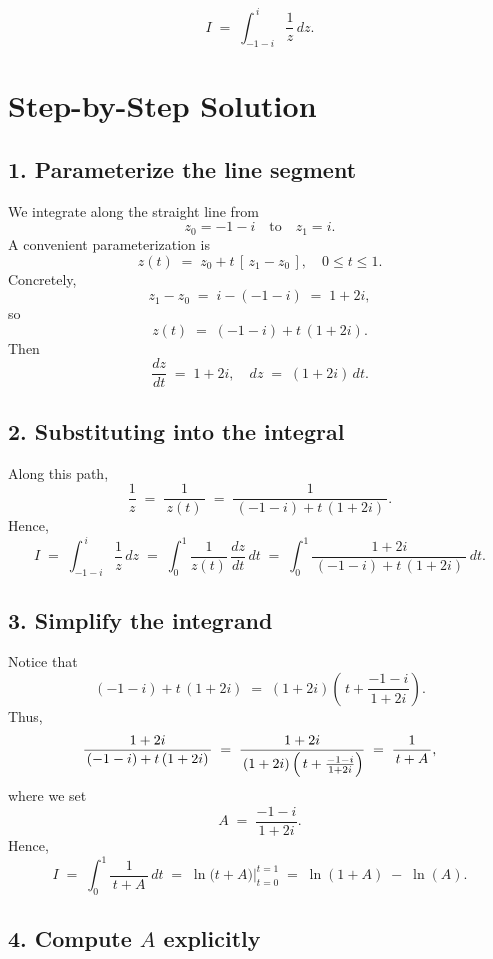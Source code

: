 \documentclass[12pt]{article}
\title{}
\author{Jerich Lee}
\date{\today}
\theoremstyle{definition} %
\theoremstyle{plain} %
\begin{document}
\maketitle
\[
I \;=\; \int_{-1 - i}^{\,i} \frac{1}{z}\,dz.
\]

\section*{Step-by-Step Solution}

\subsection*{1. Parameterize the line segment}

We integrate along the straight line from 
\[
z_0 = -1 - i 
\quad\text{to}\quad 
z_1 = i.
\]
A convenient parameterization is
\[
z(t) \;=\; z_0 + t\,[\,z_1 - z_0\,], 
\quad 0 \le t \le 1.
\]
Concretely,
\[
z_1 - z_0 \;=\; i - (-1 - i) \;=\; 1 + 2i,
\]
so
\[
z(t) \;=\; (-1 - i) + t\,(1 + 2i).
\]
Then
\[
\frac{dz}{dt} \;=\; 1 + 2i,
\quad
dz \;=\; (1 + 2i)\,dt.
\]

\subsection*{2. Substituting into the integral}

Along this path, 
\[
\frac{1}{z} \;=\; \frac{1}{\,z(t)\,} 
\;=\; \frac{1}{\,(-1 - i) + t\,(1+2i)\,}.
\]
Hence,
\[
I 
\;=\;
\int_{-1-i}^{\,i} \frac{1}{z}\,dz
\;=\;
\int_{0}^{1} 
\frac{1}{z(t)} 
\,\frac{dz}{dt}
\,dt
\;=\;
\int_{0}^{1}
\frac{1 + 2i}{\,(-1 - i) + t\,(1+2i)\,}
\,dt.
\]

\subsection*{3. Simplify the integrand}

Notice that
\[
(-1 - i) + t\,(1+2i)
\;=\;
(1 + 2i)\left(\,
t + \frac{-1 - i}{\,1 + 2i\,}
\right).
\]
Thus,
\[
\frac{1 + 2i}{\,(-1 - i) + t\,(1 + 2i)\,}
\;=\;
\frac{1 + 2i}{\,(1 + 2i)\,\Bigl(\,t + \frac{-1 - i}{1 + 2i}\Bigr)}
\;=\;
\frac{1}{\,t + A\,},
\]
where we set
\[
A 
\;=\;
\frac{-1 - i}{\,1 + 2i\,}.
\]
Hence,
\[
I 
\;=\;
\int_{0}^{1}
\frac{1}{\,t + A\,}\,dt
\;=\;
\left.
\ln\bigl(t + A\bigr)
\right|_{t=0}^{t=1}
\;=\;
\ln(1 + A) \;-\; \ln(A).
\]

\subsection*{4. Compute $A$ explicitly}
\end{document}
